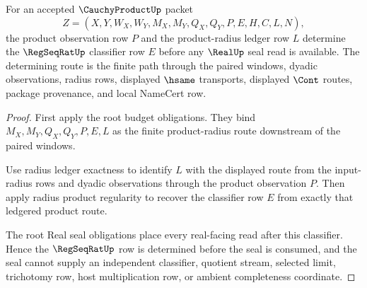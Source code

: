 \begin{theorem}
\label{thm:cauchy-product-root-regseq-seal-stability}
For an accepted $\CauchyProductUp$ packet
$$
Z=(X,Y,W_X,W_Y,M_X,M_Y,Q_X,Q_Y,P,E,H,C,L,N),
$$
the product observation row $P$ and the product-radius ledger row $L$ determine the $\RegSeqRatUp$ classifier row $E$ before any $\RealUp$ seal read is available. The determining route is the finite path through the paired windows, dyadic observations, radius rows, displayed $\hsame$ transports, displayed $\Cont$ routes, package provenance, and local NameCert row.
\end{theorem}
\begin{proof}
First apply the root budget obligations. They bind $M_X,M_Y,Q_X,Q_Y,P,E,L$ as the finite product-radius route downstream of the paired windows.

Use radius ledger exactness to identify $L$ with the displayed route from the input-radius rows and dyadic observations through the product observation $P$. Then apply radius product regularity to recover the classifier row $E$ from exactly that ledgered product route.

The root Real seal obligations place every real-facing read after this classifier. Hence the $\RegSeqRatUp$ row is determined before the seal is consumed, and the seal cannot supply an independent classifier, quotient stream, selected limit, trichotomy row, host multiplication row, or ambient completeness coordinate.
\end{proof}

